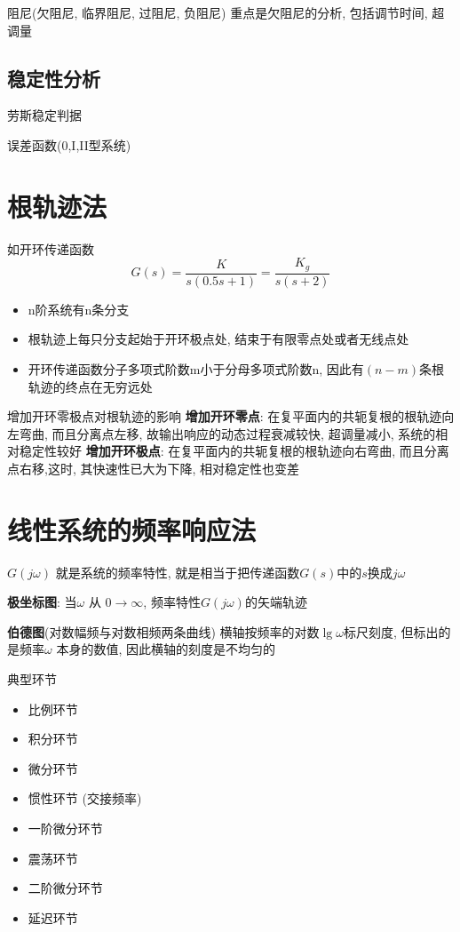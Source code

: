阻尼(欠阻尼, 临界阻尼, 过阻尼, 负阻尼)
\newline 重点是欠阻尼的分析, 包括调节时间, 超调量

\subsection{稳定性分析}
劳斯稳定判据

误差函数(0,I,II型系统)

\section{根轨迹法}
如开环传递函数
$$
G(s) = \frac{ K}{s(0.5s+1)} = \frac{K_g}{s(s+2)}
$$
\begin{itemize}
	\item n阶系统有n条分支
	\item 根轨迹上每只分支起始于开环极点处, 结束于有限零点处或者无线点处
	\item 开环传递函数分子多项式阶数m小于分母多项式阶数n, 因此有$(n-m)$条根轨迹的终点在无穷远处
\end{itemize}

增加开环零极点对根轨迹的影响\newline
\textbf{增加开环零点}: 在复平面内的共轭复根的根轨迹向左弯曲, 而且分离点左移, 故输出响应的动态过程衰减较快, 超调量减小, 系统的相对稳定性较好\newline
\textbf{增加开环极点}: 在复平面内的共轭复根的根轨迹向右弯曲, 而且分离点右移,这时, 其快速性已大为下降, 相对稳定性也变差

\section{线性系统的频率响应法}
$G(j\omega)$ 就是系统的频率特性, 就是相当于把传递函数$G(s)$中的$s$换成$j\omega$

\textbf{极坐标图}: 当$\omega$ 从 $0 \to \infty$, 频率特性$G(j\omega)$的矢端轨迹

\textbf{伯德图}(对数幅频与对数相频两条曲线)\newline
横轴按频率的对数$\lg \omega$标尺刻度, 但标出的是频率$\omega$ 本身的数值, 因此横轴的刻度是不均匀的

典型环节
\begin{itemize}
  \item 比例环节
  \item 积分环节
  \item 微分环节
  \item 惯性环节 (交接频率)
  \item 一阶微分环节
  \item 震荡环节
  \item 二阶微分环节
  \item 延迟环节
\end{itemize}

